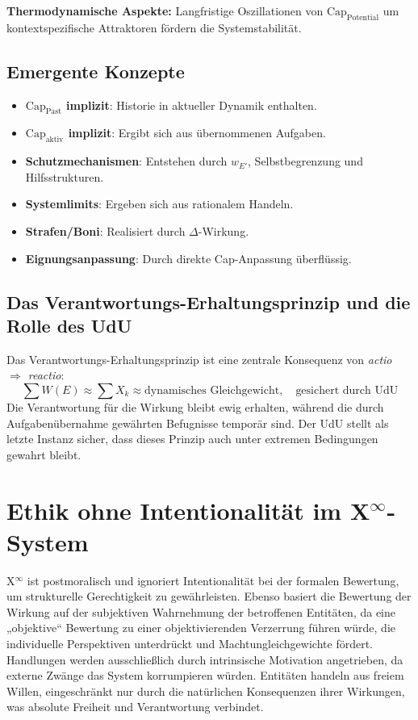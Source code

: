 \documentclass[12pt]{scrartcl}
\begin{document}
\textbf{Thermodynamische Aspekte:}
Langfristige Oszillationen von $\text{Cap}_{\text{Potential}}$ um kontextspezifische Attraktoren fördern die Systemstabilität.

\subsection{Emergente Konzepte}
\begin{itemize}
    \item \textbf{\(\text{Cap}_{\text{Past}}\) implizit}: Historie in aktueller Dynamik enthalten.
    \item \textbf{\(\text{Cap}_{\text{aktiv}}\) implizit}: Ergibt sich aus übernommenen Aufgaben.
    \item \textbf{Schutzmechanismen}: Entstehen durch $w_{E'}$, Selbstbegrenzung und Hilfsstrukturen.
    \item \textbf{Systemlimits}: Ergeben sich aus rationalem Handeln.
    \item \textbf{Strafen/Boni}: Realisiert durch $\Delta$-Wirkung.
    \item \textbf{Eignungsanpassung}: Durch direkte Cap-Anpassung überflüssig.
\end{itemize}

\subsection{Das Verantwortungs-Erhaltungsprinzip und die Rolle des UdU}
\label{sec:CapErhaltung}
Das Verantwortungs-Erhaltungsprinzip ist eine zentrale Konsequenz von \emph{actio $\Rightarrow$ reactio}:
\begin{equation}
\sum W(E) \approx \sum X_k \approx \text{dynamisches Gleichgewicht}, \quad \text{gesichert durch UdU}
\label{eq:VerantwortungErhaltungFinal}
\end{equation}
Die Verantwortung für die Wirkung bleibt ewig erhalten, während die durch Aufgabenübernahme gewährten Befugnisse temporär sind. Der UdU stellt als letzte Instanz sicher, dass dieses Prinzip auch unter extremen Bedingungen gewahrt bleibt.

\section{Ethik ohne Intentionalität im X$^\infty$-System}
\label{sec:EthikOhneIntentionalitaet}

X$^\infty$ ist postmoralisch und ignoriert Intentionalität bei der formalen Bewertung, um strukturelle Gerechtigkeit zu gewährleisten. Ebenso basiert die Bewertung der Wirkung auf der subjektiven Wahrnehmung der betroffenen Entitäten, da eine „objektive“ Bewertung zu einer objektivierenden Verzerrung führen würde, die individuelle Perspektiven unterdrückt und Machtungleichgewichte fördert. Handlungen werden ausschließlich durch intrinsische Motivation angetrieben, da externe Zwänge das System korrumpieren würden. Entitäten handeln aus freiem Willen, eingeschränkt nur durch die natürlichen Konsequenzen ihrer Wirkungen, was absolute Freiheit und Verantwortung verbindet.
\end{document}
